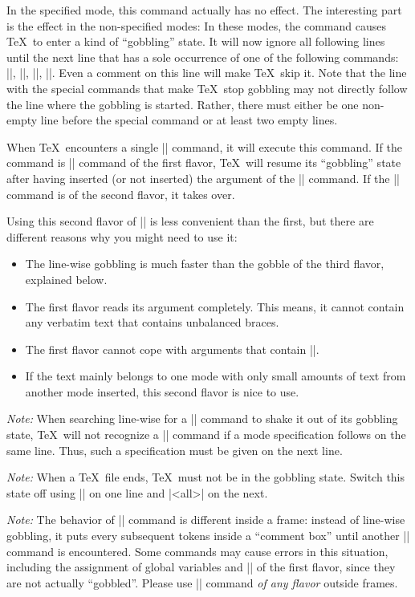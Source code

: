 \begin{command}{\mode{}}
  In the specified mode, this command actually has no effect. The interesting part is the effect in the non-specified modes: In these modes, the command causes \TeX\ to enter a kind of ``gobbling'' state. It will now ignore all following lines until the next line that has a sole occurrence of one of the following commands: |\mode|, |\mode*|, ||, ||. Even a comment on this line will make \TeX\ skip it. Note that the line with the special commands that make \TeX\ stop gobbling may not directly follow the line where the gobbling is started. Rather, there must either be one non-empty line before the special command or at least two empty lines.

  When \TeX\ encounters a single |\mode| command, it will execute this command. If the command is |\mode| command of the first flavor, \TeX\ will resume its ``gobbling'' state after having inserted (or not inserted) the argument of the |\mode| command. If the |\mode| command is of the second flavor, it takes over.

  Using this second flavor of |\mode| is less convenient than the first, but there are different reasons why you might need to use it:
  \begin{itemize}
  \item
    The line-wise gobbling is much faster than the gobble of the third flavor, explained below.
  \item
    The first flavor reads its argument completely. This means, it cannot contain any verbatim text that contains unbalanced braces.
  \item
    The first flavor cannot cope with arguments that contain ||.
  \item
    If the text mainly belongs to one mode with only small amounts of text from another mode inserted, this second flavor is nice to use.
  \end{itemize}

  \emph{Note:} When searching line-wise for a |\mode| command to shake it out of its gobbling state, \TeX\ will not recognize a |\mode| command if a mode specification follows on the same line. Thus, such a specification must be given on the next line.

  \emph{Note:} When a \TeX\ file ends, \TeX\ must not be in the gobbling state. Switch this state off using |\mode| on one line and |<all>| on the next.

  \emph{Note:} The behavior of |\mode| command is different inside a frame: instead of line-wise gobbling, it puts every subsequent tokens inside a ``comment box'' until another |\mode| command is encountered. Some commands may cause errors in this situation, including the assignment of global variables and |\mode| of the first flavor, since they are not actually ``gobbled''. Please use |\mode| command \emph{of any flavor} outside frames.


\end{command}
